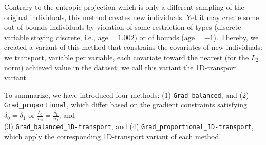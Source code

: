 \documentclass[runningheads, orivec]{llncs}
\begin{document}
Contrary to the entropic projection which is only a different sampling of the original individuals, this method creates new individuals. Yet it may create some out of bounds individuals by violation of some restriction of types (discrete variable staying discrete, i.e., $\text{age} = 1.002$) or of bounds ($\text{age} = -1$). Thereby, we created a variant of this method that constrains the covariates of new individuals: we transport, variable per variable, each covariate toward the nearest (for the $L_2$ norm) achieved value in the dataset; we call this variant the {1D-transport} variant. 

To summarize, we have introduced four methods: (1) \texttt{Grad\_balanced}, and (2) \texttt{Grad\_proportional}, which differ based on the gradient constraints satisfying $\delta_0 = \delta_1$ or $\frac{\delta_0}{n_0} = \frac{\delta_1}{n_1}$; and \\ (3) \texttt{Grad\_balanced\_1D-transport}, and (4) \texttt{Grad\_proportional\_1D-transport}, which apply the corresponding 1D-transport variant of each method.
\end{document}
